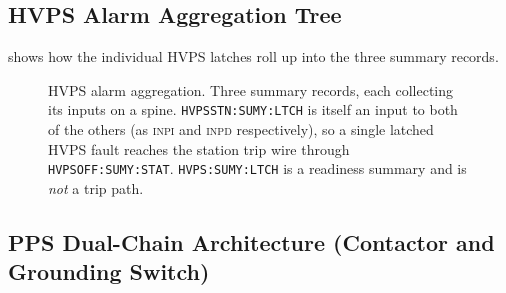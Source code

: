\subsection{HVPS Alarm Aggregation Tree}\label{sec:hvps-alarm-tree}


 shows how the individual HVPS latches roll up into the three summary records.


\begin{figure}[tbp]
\centering
\begin{fitpicture}\end{fitpicture}
\caption[HVPS alarm aggregation.]{HVPS alarm aggregation. Three summary records, each collecting its inputs on a spine. \texttt{HVPSSTN:\allowbreak{}SUMY:\allowbreak{}LTCH} is itself an input to both of the others (as \textsc{inpi} and \textsc{inpd} respectively), so a single latched HVPS fault reaches the station trip wire through \texttt{HVPSOFF:\allowbreak{}SUMY:\allowbreak{}STAT}. \texttt{HVPS:\allowbreak{}SUMY:\allowbreak{}LTCH} is a readiness summary and is \emph{not} a trip path.}\label{fig:hvps-alarm-tree}
\end{figure}

\subsection{PPS Dual-Chain Architecture (Contactor and Grounding Switch)}\label{sec:pps-chains}


